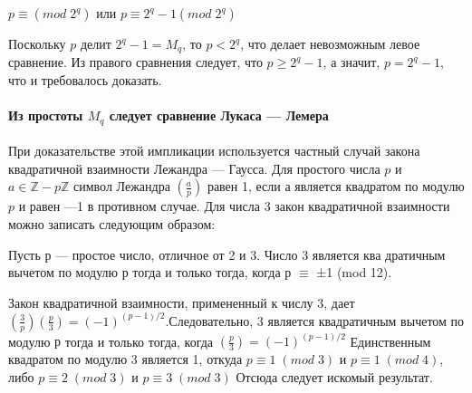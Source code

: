 	 \begin{center}
	 	$p\equiv (mod \; 2^q)$ или $ p\equiv2^q-1 (mod \; 2^q)$
	 \end{center}
     Поскольку $p$ делит $2^q-1 = M_q$, то $p<2^q$, что делает невозможным левое сравнение. Из правого сравнения следует, что $p\geqslant 2^q-1$, а значит, $p=2^q-1$, что и требовалось доказать.
     
     \pagebreak
     
     
     
     \paragraph{Из простоты $M_q$  следует сравнение Лукаса — Лемера} 
     
     \noindent 
     
     При доказательстве этой импликации используется частный случай закона квадратичной взаимности Лежандра — Гаусса. Для простого  числа $p$ и $a \in \mathbb Z - p\mathbb Z$ символ Лежандра  $(\frac{a}{p})$ равен 1, если $а$ является
     квадратом по модулю $p$ и равен —1 в противном случае. Для числа 3  закон квадратичной взаимности можно записать следующим образом:
     
     \begin{lemma}
     \noindent
     
     Пусть $р$ — простое число, отличное от 2 и 3. Число 3 является ква дратичным вычетом по модулю $р$ тогда и только тогда, когда $р$ $\equiv$ ±1
     (mod 12).
     \end{lemma}
     \begin{myproof}
     \noindent
     
 	 
 	 	
 	 	Закон квадратичной взаимности, примененный к числу 3, дает  $(\frac{3}{p})(\frac{p}{3}) = (-1)^{(p-1)/2}$.Следовательно, 3 является квадратичным вычетом по модулю $р$ тогда и только тогда, когда $(\frac{p}{3}) = (-1)^{(p-1)/2}$ Единственным квадратом по модулю 3 является 1, откуда $p \equiv 1 \;(mod \; 3)$ и $p \equiv 1 \;(mod \; 4)$, либо $p \equiv 2 \;(mod \; 3)$ и $p \equiv 3 \;(mod \; 3)$ Отсюда следует искомый результат.
	 \end{myproof}
 
